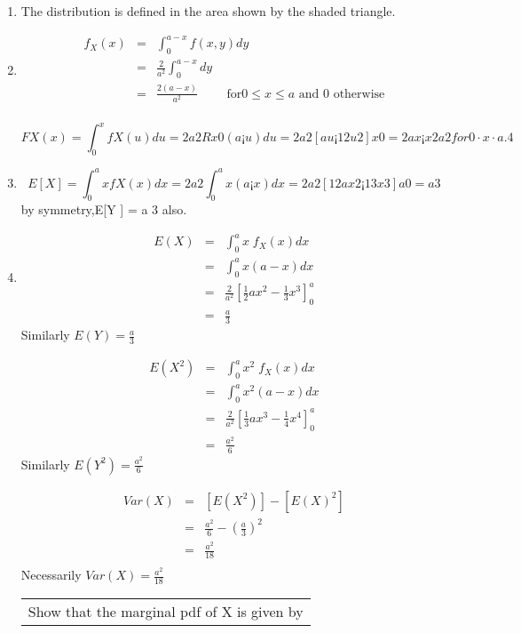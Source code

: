 \documentclass[a4paper,12pt]{article}
\begin{document}
\begin{enumerate}
\item The distribution is defined in the area shown by the shaded triangle.

\item  \begin{eqnarray*}
f_X(x)
&=& \int^{a-x}_{0} f(x,y) dy \\
&=&  \frac{2}{a^2} \int^{a-x}_{0} dy \\
&=& \frac{2(a-x)}{a^2} \qquad \mbox{ for}  0 \leq x \leq a \mbox{ and } 0 \mbox{ otherwise} \\
\end{eqnarray*}

\[FX(x) =
\int^{x}_{0}fX(u)du = 2
a2
R x
0 (a ¡ u)du = 2
a2 [au ¡ 1
2u2]x
0 = 2ax¡x2
a2 for 0 · x · a.
4\]
\item \[E[X] =
\int^{a}_{0}xfX(x)dx = 2
a2
\int^{a}_{0}x(a ¡ x)dx = 2
a2 [ 1
2ax2 ¡ 1
3x3]a
0 = a
3 \]by symmetry,E[Y ] = a
3
also.
\item 

\begin{eqnarray*}
E(X) &=& \int^{a}_{0} x \;f_X(x) dx \\
    &=&\int^{a}_{0} x(a-x) dx \\
    &=&  \frac{2}{a^2}\left[ \frac{1}{2}ax^2 - \frac{1}{3}x^3  \right]^{a}_{0}\\
    &=& \frac{a}{3}  
\end{eqnarray*}
Similarly $E(Y) = \frac{a}{3} $

\begin{eqnarray*}
E(X^2) &=& \int^{a}_{0} x^2 \;f_X(x) dx \\
    &=&\int^{a}_{0} x^2(a-x) dx \\
    &=&  \frac{2}{a^2}\left[ \frac{1}{3}ax^3 - \frac{1}{4}x^4  \right]^{a}_{0}\\
    &=& \frac{a^2}{6}  
\end{eqnarray*}
Similarly $E(Y^2) = \frac{a^2}{6} $

\begin{eqnarray*}
Var(X) &=& [E(X^2)] - [E(X)^2] \\
      &=& \frac{a^2}{6} - \left(\frac{a}{3}\right)^2 \\
     &=& \frac{a^2}{18} \\
\end{eqnarray*}
Necessarily $Var(X) = \frac{a^2}{18}$


\newpage
  \begin{table}[ht!]
     \centering
     \begin{tabular}{|p{15cm}|}
     \hline
  Show that the marginal pdf of X is given by 




\end{tabular}
\end{table}
\end{enumerate}
\end{document}
